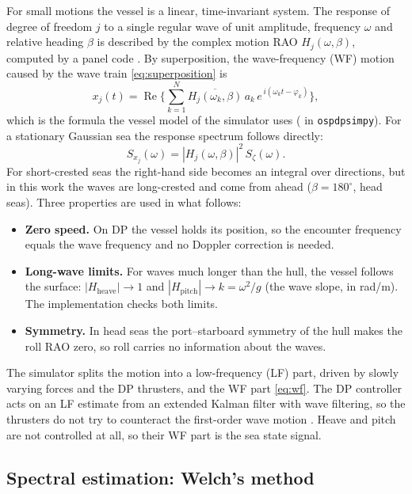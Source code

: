 \documentclass[11pt,a4paper]{article}
\begin{document}
For small motions the vessel is a linear, time-invariant system. The response of degree of
freedom $j$ to a single regular wave of unit amplitude, frequency $\omega$ and relative heading
$\beta$ is described by the complex motion RAO $H_j(\omega, \beta)$, computed by a panel
code \citep{faltinsen1990}. By superposition, the wave-frequency (WF) motion caused by the
wave train \cref{eq:superposition} is
\begin{equation}
  x_j(t) = \operatorname{Re}\Big\{ \sum_{k=1}^{N} \overline{H_j(\omega_k, \beta)}\,
            a_k\, e^{\,i(\omega_k t - \varphi_k)} \Big\},
  \label{eq:wf}
\end{equation}
which is the formula the vessel model of the simulator uses
( in \texttt{ospdpsimpy}).
For a stationary Gaussian sea the response spectrum follows directly:
\begin{equation}
  S_{x_j}(\omega) = |H_j(\omega, \beta)|^2\, S_\zeta(\omega).
  \label{eq:response}
\end{equation}
For short-crested seas the right-hand side becomes an integral over directions, but in this
work the waves are long-crested and come from ahead ($\beta = 180^\circ$, head seas).
Three properties are used in what follows:
\begin{itemize}
  \item \textbf{Zero speed.} On DP the vessel holds its position, so the encounter frequency
        equals the wave frequency and no Doppler correction is needed.
  \item \textbf{Long-wave limits.} For waves much longer than the hull, the vessel follows the
        surface: $|H_{\text{heave}}| \to 1$ and $|H_{\text{pitch}}| \to k = \omega^2/g$
        (the wave slope, in rad/m). The implementation checks both limits.
  \item \textbf{Symmetry.} In head seas the port--starboard symmetry of the hull makes the roll
        RAO zero, so roll carries no information about the waves.
\end{itemize}
The simulator splits the motion into a low-frequency (LF) part, driven by slowly varying forces
and the DP thrusters, and the WF part \cref{eq:wf}. The DP controller acts on an LF estimate
from an extended Kalman filter with wave filtering, so the thrusters do not try to counteract
the first-order wave motion \citep{fossen2021,sorensen2013}. Heave and pitch are not controlled
at all, so their WF part is the sea state signal.

\subsection{Spectral estimation: Welch's method}
\label{sec:welch}
\end{document}

